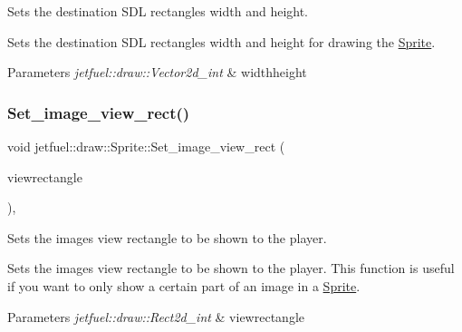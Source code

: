 Sets the destination S\+DL rectangle\textquotesingle{}s width and height. 

Sets the destination S\+DL rectangle\textquotesingle{}s width and height for drawing the \hyperlink{classjetfuel_1_1draw_1_1Sprite}{Sprite}.


\begin{DoxyParams}{Parameters}
{\em jetfuel\+::draw\+::\+Vector2d\+\_\+int} & widthheight \\
\hline
\end{DoxyParams}
\mbox{\label{classjetfuel_1_1draw_1_1Sprite_a684ee9b8ae0faa03878cb4b2f9e0ea19}} 
\subsubsection{\texorpdfstring{Set\+\_\+image\+\_\+view\+\_\+rect()}{Set\_image\_view\_rect()}}
{\footnotesize\ttfamily void jetfuel\+::draw\+::\+Sprite\+::\+Set\+\_\+image\+\_\+view\+\_\+rect (\begin{DoxyParamCaption}\item[{const \hyperlink{classjetfuel_1_1draw_1_1Rect2d}{Rect2d\+\_\+int}}]{viewrectangle }\end{DoxyParamCaption})\hspace{0.3cm}{\ttfamily [inline]}, {\ttfamily [protected]}}



Sets the image\textquotesingle{}s view rectangle to be shown to the player. 

Sets the image\textquotesingle{}s view rectangle to be shown to the player. This function is useful if you want to only show a certain part of an image in a \hyperlink{classjetfuel_1_1draw_1_1Sprite}{Sprite}.


\begin{DoxyParams}{Parameters}
{\em jetfuel\+::draw\+::\+Rect2d\+\_\+int} & viewrectangle \\
\hline
\end{DoxyParams}
\mbox{\label{classjetfuel_1_1draw_1_1Sprite_ad9e1cb6483d8ca4de5e3d7e72ca41973}} 
